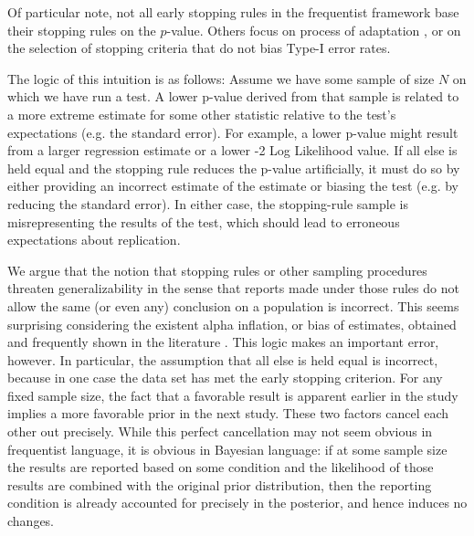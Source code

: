 \documentclass[man]{apa7}
\theoremstyle{definition}
\begin{document}
Of particular note, not all early stopping rules in the frequentist framework base their stopping rules on the $p$-value.  Others focus on process of adaptation \parencite[][]{chow2008adaptive}, or on the selection of stopping criteria \parencite[e.g. estimate precision][]{KenKelly} that do not bias Type-I error rates.

The logic of this intuition is as follows: Assume we have some sample of size $N$ on which we have run a test.  A lower p-value %
derived from that sample is related to a more extreme estimate for some other statistic relative to the test's expectations (e.g. the standard error).  For example, a lower p-value might result from a larger regression estimate or a lower -2 Log Likelihood value.  If all else is held equal and the stopping rule reduces the p-value artificially, it must do so by either providing an incorrect estimate of the estimate or biasing the test (e.g. by reducing the standard error).  In either case, the stopping-rule sample is misrepresenting the results of the test, which should lead to erroneous expectations about replication.

We argue that the notion that stopping rules or other sampling procedures threaten generalizability in the sense that reports made under those rules do not allow the same (or even any) conclusion on a population is incorrect.  This seems surprising considering the existent alpha inflation, or bias of estimates, obtained and frequently shown in the literature \parencite{ioannidis2005most}. This logic makes an important error, however.  In particular, the assumption that all else is held equal is incorrect, because in one case the data set has met the early stopping criterion.  For any fixed sample size, the fact that a favorable result is apparent earlier in the study implies a more favorable prior in the next study.  These two factors cancel each other out precisely.  While this perfect cancellation may not seem obvious in frequentist language, it is obvious in Bayesian language: if at some sample size the results are reported based on some condition and the likelihood of those results are combined with the original prior distribution, then the reporting condition is already accounted for precisely in the posterior, and hence induces no changes. 
\end{document}
